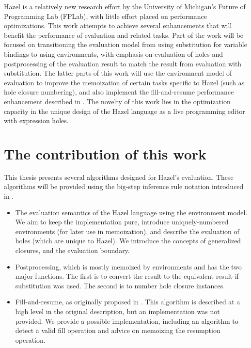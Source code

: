 Hazel is a relatively new research effort by the University of Michigan's Future of Programming Lab (FPLab), with little effort placed on performance optimizations. This work attempts to achieve several enhancements that will benefit the performance of evaluation and related tasks. Part of the work will be focused on transitioning the evaluation model from using substitution for variable bindings to using environments, with emphasis on evaluation of holes and postprocessing of the evaluation result to match the result from evaluation with substitution. The latter parts of this work will use the environment model of evaluation to improve the memoization of certain tasks specific to Hazel (such as hole closure numbering), and also implement the fill-and-resume performance enhancement described in \cite{conf/popl/HazelnutLive19}. The novelty of this work lies in the optimization capacity in the unique design of the Hazel language as a live programming editor with expression holes.

\section{The contribution of this work}
\label{sec:contribution}

This thesis presents several algorithms designed for Hazel's evaluation. These algorithms will be provided using the big-step inference rule notation introduced in .
\begin{itemize}
\item The evaluation semantics of the Hazel language using the environment model. We aim to keep the implementation pure, introduce uniquely-numbered environments (for later use in memoization), and describe the evaluation of holes (which are unique to Hazel). We introduce the concepts of generalized closures, and the evaluation boundary.
\item Postprocessing, which is mostly memoized by environments and has the two major functions. The first is to convert the result to the equivalent result if substitution was used. The second is to number hole closure instances.
\item Fill-and-resume, as originally proposed in \cite{conf/popl/HazelnutLive19}. This algorithm is described at a high level in the original description, but an implementation was not provided. We provide a possible implementation, including an algorithm to detect a valid fill operation and advice on memoizing the resumption operation.
\end{itemize}

